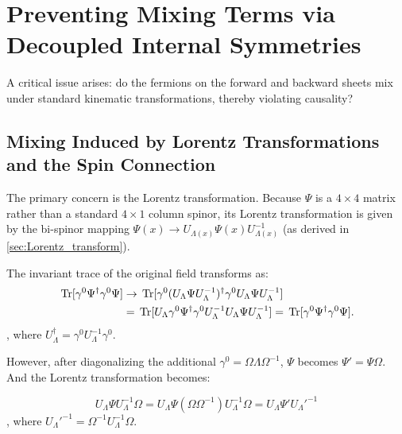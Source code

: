 \section{Preventing Mixing Terms via Decoupled Internal Symmetries}\label{sec:prevent_mixing_term}

A critical issue arises: do the fermions on the forward and backward sheets mix under standard kinematic transformations, thereby violating causality? 

\subsection{Mixing Induced by Lorentz Transformations and the Spin Connection}\label{subsec:mixing_term_Lorentz_spin_connection}

The primary concern is the Lorentz transformation. Because $\Psi$ is a $4\times 4$ matrix rather than a standard $4\times 1$ column spinor, its Lorentz transformation is given by the bi-spinor mapping $\Psi(x)\to U_{\Lambda(x)} \Psi(x) U_{\Lambda(x)}^{-1}$ (as derived in \cref{sec:Lorentz_transform}). 

The invariant trace of the original field transforms as:
\begin{equation}
\begin{aligned}
    \,{\rm Tr}[\gamma^0\Psi^\dagger\gamma^0 \Psi]&\to  \,{\rm Tr}[\gamma^0(U_{\Lambda} \Psi U_{\Lambda}^{-1})^\dagger\gamma^0 U_{\Lambda} \Psi U_{\Lambda}^{-1}]\\
    &=\,{\rm Tr}[U_{\Lambda}\gamma^0 \Psi^\dagger\gamma^0 U_{\Lambda}^{-1}U_{\Lambda} \Psi U_{\Lambda}^{-1}]=\,{\rm Tr}[\gamma^0\Psi^\dagger\gamma^0 \Psi].
\end{aligned}
\end{equation}
, where $U_\Lambda^\dagger=\gamma^0 U_\Lambda^{-1}\gamma^0$.

However, after diagonalizing the additional $\gamma^0=\Omega\Lambda\Omega^{-1}$, $\Psi$ becomes $\Psi'=\Psi\Omega$. And the Lorentz transformation becomes:

\begin{equation}\label{eq:Lorentz_transform_Psi_prime}
    U_{\Lambda} \Psi U_{\Lambda}^{-1}\Omega= U_{\Lambda} \Psi(\Omega \Omega^{-1})U_{\Lambda}^{-1}\Omega=U_{\Lambda} \Psi' U_{\Lambda}'^{-1}
\end{equation}
, where $U_{\Lambda}'^{-1}=\Omega^{-1}U_{\Lambda}^{-1}\Omega$.

